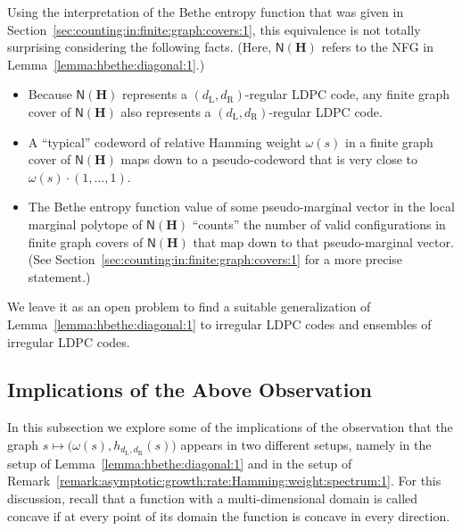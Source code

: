 \documentclass[journal, twocolumn]{IEEEtran}
\renewcommand{\mathbf}[1]{{\bm{#1}}}
\newcommand{\matr}[1]{\mathbf{#1}}
\newcommand{\graph}[1]{\mathsf{#1}}
\newcommand{\matrH}{\matr{H}}
\newcommand{\dleft}{d_{\mathrm{L}}}
\newcommand{\dright}{d_{\mathrm{R}}}
\newcommand{\graphN}{\graph{N}}
\newcommand{\?}{\mathrm{?}}
\begin{document}
Using the interpretation of the Bethe entropy function that was given in
Section~\ref{sec:counting:in:finite:graph:covers:1}, this equivalence is not
totally surprising considering the following facts. (Here, $\graphN(\matrH)$
refers to the NFG in Lemma~\ref{lemma:hbethe:diagonal:1}.)
\begin{itemize}

\item Because $\graphN(\matrH)$ represents a $(\dleft,\dright)$-regular LDPC
  code, any finite graph cover of $\graphN(\matrH)$ also represents a
  $(\dleft,\dright)$-regular LDPC code.

\item A ``typical'' codeword of relative Hamming weight $\omega(s)$ in a
  finite graph cover of $\graphN(\matrH)$ maps down to a pseudo-codeword that
  is very close to $\omega(s) \cdot (1, \ldots, 1)$.

\item The Bethe entropy function value of some pseudo-marginal vector in the
  local marginal polytope of $\graphN(\matrH)$ ``counts'' the number of valid
  configurations in finite graph covers of $\graphN(\matrH)$ that map down to
  that pseudo-marginal vector. (See
  Section~\ref{sec:counting:in:finite:graph:covers:1} for a more precise
  statement.)

\end{itemize}
We leave it as an open problem to find a suitable generalization of
Lemma~\ref{lemma:hbethe:diagonal:1} to irregular LDPC codes and ensembles of
irregular LDPC codes.


\subsection{Implications of the Above Observation}
\label{sec:implications:minimum:Hamming:distance:1}


In this subsection we explore some of the implications of the observation that
the graph $s \mapsto \bigl( \omega(s), h_{\dleft,\dright}(s) \bigr)$ appears
in two different setups, namely in the setup of
Lemma~\ref{lemma:hbethe:diagonal:1} and in the setup of
Remark~\ref{remark:asymptotic:growth:rate:Hamming:weight:spectrum:1}. For this
discussion, recall that a function with a multi-dimensional domain is called
concave if at every point of its domain the function is concave in every
direction.
\end{document}
